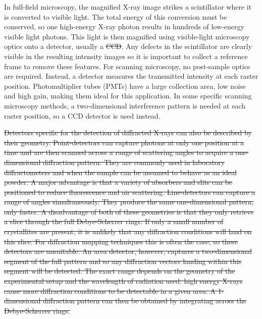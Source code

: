 \documentclass[journal=cmatex,manuscript=perspective]{achemso}
\providecommand{\DIFaddtex}[1]{{\protect\color{blue}\uwave{#1}}} %
\providecommand{\DIFdeltex}[1]{{\protect\color{red}\sout{#1}}}                      %
\providecommand{\DIFaddbegin}{} %
\providecommand{\DIFaddend}{} %
\providecommand{\DIFdelbegin}{} %
\providecommand{\DIFdelend}{} %
\providecommand{\DIFadd}[1]{\texorpdfstring{\DIFaddtex{#1}}{#1}} %
\providecommand{\DIFdel}[1]{\texorpdfstring{\DIFdeltex{#1}}{}} %
\begin{document}
In full-field microscopy, the magnified X-ray image strikes a
scintillator where it is converted to visible light. The total energy
of this conversion must be conserved, so one high-energy X-ray photon
results in hundreds of low-energy visible light photons. This light is
then magnified using visible-light microscopy optics onto a detector,
usually a \DIFdelbegin \DIFdel{CCD}\DIFdelend \DIFaddbegin \DIFadd{charge-coupled device (CCD)}\DIFaddend . Any defects in the scintillator
are clearly visible in the resulting intensity images so it is
important to collect a reference frame to remove these features. For
scanning microscopy, no post-sample optics are required. Instead, a
detector measures the transmitted intensity at each raster
position. Photomultiplier tubes (PMTs) have a large collection area,
low noise and high gain, making them ideal for this application. In
some specific scanning microscopy methods, a two-dimensional
interference pattern is needed at each raster position, so a CCD
detector is used instead.

\DIFdelbegin \DIFdel{Detectors specific for the detection of diffracted X-rays can also be
described by their geometry. Point-detectors can capture photons at
only one position at a time and are then scanned across a range of
scattering angles to acquire a one-dimensional diffraction
pattern. They are commonly used in laboratory diffractometers and when
the sample can be assumed to behave as an ideal powder. A major
advantage is that a variety of absorbers and slits can be positioned
to reduce fluorescence and air scattering. Line-detectors can capture
a range of angles simultaneously. They produce the same
one-dimensional pattern, only faster. A disadvantage of both of these
geometries is that they only retrieve a slice through the full
Debye-Scherrer rings. If only a small number of crystallites are
present, it is unlikely that any diffraction conditions will land on
this slice. For diffraction mapping techniques this is often the case,
so these detectors are unsuitable. An area detector, however, captures
a two-dimensional segment of the full pattern and so any diffraction
vectors landing within this segment will be detected. The exact range
depends on the geometry of the experimental setup and the wavelength
of radiation used: high energy X-rays cause more diffraction
conditions to be detectable in a given area. A 1-dimensional
diffraction pattern can then be obtained by integrating across the
Debye-Scherrer rings.
}%
\end{document}
